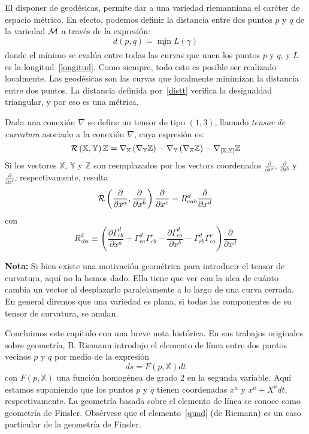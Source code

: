 El disponer de geod\'esicas, permite dar a una variedad riemanniana el car\'cter
de espacio m\'etrico.  En efecto, podemos definir la  distancia entre dos puntos
$p$ y $q$ de la variedad $\mathcal{M}$ a trav\'es de la expresi\'on:
%
\begin{equation}
d(p,q) = \min_{\gamma} L(\gamma) \label{distt}
\end{equation}
%
\noindent donde  el m\'inimo  se eval\'ua  entre todas las  curvas que  unen los
puntos $p$ y $q$, y $L$ es la longitud~\eqref{longitud}. Como siempre, todo esto
es  posible ser  realizado  localmente.   Las geod\'esicas  son  las curvas  que
localmente  minimizan  la distancia  entre  dos  puntos.  La distancia  definida
por~\eqref{distt}  verifica  la  desigualdad   triangular,  y  por  eso  es  una
m\'etrica.

Dada una conexi\'on  $\nabla$ se define un tensor de  tipo $(1,3)$, llamado {\it
  tensor de curvatura} asociado a la conexi\'on $\nabla$, cuya espresi\'on es:
%
\[
\mathcal{R}\left( \mathbb{X} , \mathbb{Y} \right) \mathbb{Z} = \nabla_{\mathbb{X}} \left(
  \nabla_{\mathbb{Y}}   \mathbb{Z}    \right)   -   \nabla_{\mathbb{Y}}   \left(
  \nabla_{\mathbb{X}}  \mathbb{Z}   \right)  -  \nabla_{[\mathbb{X},\mathbb{Y}]}
\mathbb{Z}
\]
%
Si los  vectores $\mathbb{X}$, $\mathbb{Y}$ y $\mathbb{Z}$  son reemplazados por
los       vectors       coordenados       $\frac{\partial}{\partial       x^a}$,
$\frac{\partial}{\partial     x^b}$    y     $\frac{\partial}{\partial    x^c}$,
respectivamente, resulta
%
\[
\mathcal{R}\left( \frac{\partial}{\partial  x^a} , \frac{\partial}{\partial  x^b} \right)
\frac{\partial}{\partial x^c} = R^d_{cab} \frac{\partial}{\partial x^d}
\]
%
con
%
\[
R^d_{cba}   \equiv  \left(  \frac{   \partial  \Gamma^d_{cb}}{\partial   x^a}  +
  \Gamma^d_{ra} \Gamma^r_{cb}  - \frac{ \partial  \Gamma^d_{ca}}{\partial x^b} -
  \Gamma^d_{rb} \Gamma^r_{ca}\right) \frac{\partial}{\partial x^d}
\]

{\bf  Nota:} Si  bien existe  una motivaci\'on  geom\'etrica para  introducir el
tensor de curvatura, aqu\'i no la hemos  dado. Ella tiene que ver con la idea de
cu\'anto cambia un  vector al desplazarlo paralelamente a lo  largo de una curva
cerrada. En general diremos que una  variedad es plana, si todas las componentes
de su tensor de curvatura, se anulan.

Concluimos  este cap\'itulo  con una  breve  nota hist\'orica.  En sus  trabajos
originales sobre geometr\'ia, B. Riemann  introdujo el elemento de l\'inea entre
dos puntos vecinos $p$ y $q$ por medio de la expresi\'on
\begin{equation}
ds = F(p, \mathbb{X})dt \label{linea}
\end{equation}
%
con $F(  p , \mathbb{X} )$  una funci\'on homog\'enea  de grado 2 en  la segunda
variable. Aqu\'i estamos suponiendo que  los puntos $p$ y $q$ tienen coordenadas
${x^a}$  y ${x^a +  X^a dt}$,  respectivamente. La  geometr\'ia basada  sobre el
elemento de l\'inea  se conoce como geometr\'ia de  Finsler.  Obs\'ervese que el
elemento~\eqref{quad} (de  Riemann) es un  caso particular de la  geometr\'ia de
Finsler.